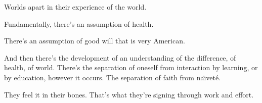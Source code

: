

Worlds apart in their experience of the world.

Fundamentally, there's an assumption of health.  

There's an assumption of good will that is very \break American.

And then there's the development of an \break understanding of the
difference, of health, of world.  \break  There's the separation of oneself
from interaction by learning, or by education, however it occurs.  The
separation of faith from na\"{\i}vet\'{e}.

They feel it in their bones.  That's what they're signing through work
and effort.

\bye
